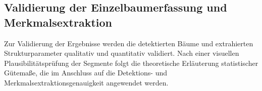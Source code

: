 \subsection{Validierung der Einzelbaumerfassung und Merkmalsextraktion}

Zur Validierung der Ergebnisse werden die detektierten Bäume und extrahierten Strukturparameter qualitativ und quantitativ validiert. Nach einer visuellen Plausibilitätsprüfung der Segmente folgt die theoretische Erläuterung statistischer Gütemaße, die im Anschluss auf die Detektions- und Merkmalsextraktionsgenauigkeit angewendet werden.